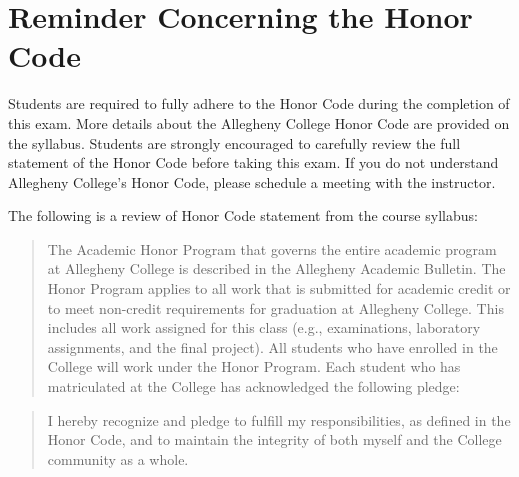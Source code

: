\documentclass[11pt]{article}
\begin{document}
\section*{Reminder Concerning the Honor Code}

\vspace*{-.02in}

\noindent Students are required to fully adhere to the Honor Code during the
completion of this exam. More details about the Allegheny College Honor Code are
provided on the syllabus. Students are strongly encouraged to carefully review
the full statement of the Honor Code before taking this exam. If you do not
understand Allegheny College's Honor Code, please schedule a meeting with the
instructor.

\vspace*{.1in}

The following is a review of Honor Code statement from the course
syllabus:

\begin{quote}
  The Academic Honor Program that governs the entire academic program at
  Allegheny College is described in the Allegheny Academic Bulletin. The Honor
  Program applies to all work that is submitted for academic credit or to meet
  non-credit requirements for graduation at Allegheny College. This includes all
  work assigned for this class (e.g., examinations, laboratory assignments, and
  the final project). All students who have enrolled in the College will work
  under the Honor Program. Each student who has matriculated at the College has
  acknowledged the following pledge:
\end{quote}

\begin{quote}
  I hereby recognize and pledge to fulfill my responsibilities, as defined in
  the Honor Code, and to maintain the integrity of both myself and the College
  community as a whole.
\end{quote}
\end{document}
